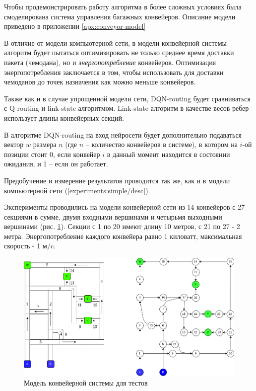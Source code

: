 \documentclass[specification, annotation]{itmo-student-thesis}
\begin{document}
Чтобы продемонстрировать работу алгоритма в более сложных условиях была
смоделирована система управления багажных конвейеров. Описание модели
приведено в приложении \ref{apx:conveyor-model}

В отличие от модели компьютерной сети, в модели конвейерной системы алгоритм
будет пытаться оптимизировать не только среднее время доставки пакета
(чемодана), но и \textit{энергопотребление} конвейеров. Оптимизация
энергопотребления заключается в том, чтобы использовать для доставки чемоданов
до точек назначения как можно меньше конвейеров.

Также как и в случае упрощенной модели сети, DQN-routing будет сравниваться с
Q-routing и link-state алгоритмом. Link-state алгоритм в качестве весов ребер
использует длины конвейерных секций. 

В алгоритме DQN-routing на вход нейросети будет дополнительно подаваться вектор
$w$ размера $n$ (где $n$ -- количество конвейеров в системе), в котором на $i$-ой
позиции стоит 0, если конвейер $i$ в данный момент находится в состоянии
ожидания, и 1 -- если он работает.

Предобучение и измерение результатов проводится так же, как и в модели
компьютерной сети (\ref{experiments:simple/desc}).

Эксперименты проводились на модели конвейерной сети из 14 конвейеров с 27
секциями в сумме, двумя входными вершинами и четырьмя выходными вершинами (рис.
\ref{test-conveyors}). Секции с 1 по 20 имеют длину 10 метров, с 21 по 27 - 2
метра. Энергопотребление каждого конвейера равно 1 киловатт, максимальная
скорость - 1 м/c.

\begin{figure}[!h]
  \caption{Модель конвейерной системы для тестов}\label{test-conveyors}
  \centering
  \includegraphics[scale=0.5]{test-conveyors}
\end{figure}
\end{document}
